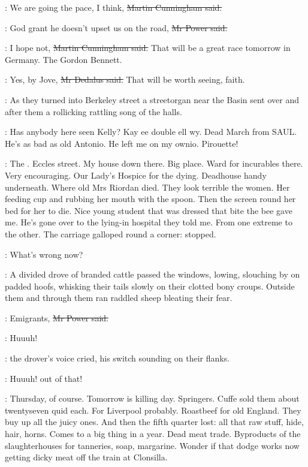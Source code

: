 \cunningham:
We are going the pace, I think,
\sout{Martin Cunningham said.}

\power:
God grant he doesn't upset us on the road,
\sout{Mr Power said.}

\cunningham:
I hope not,
\sout{Martin Cunningham said.}
That will be a great race tomorrow in Germany.
The Gordon Bennett.

\simon:
Yes, by Jove,
\sout{Mr Dedalus said.}
That will be worth seeing, faith.

:
As they turned into Berkeley street
a streetorgan near the Basin sent over and after them
a rollicking rattling song of the halls.

:
Has anybody here seen Kelly?
Kay ee double ell wy.
Dead March from SAUL.
He's as bad
as old Antonio.
He left me on my ownio.
Pirouette!

\BloomInt:
The .
Eccles street.
My house down there.
Big place.
Ward for incurables there.
Very encouraging.
Our Lady's Hospice for the dying.
Deadhouse handy underneath.
Where old Mrs Riordan died.
They look terrible the women.
Her feeding cup and rubbing her mouth with the spoon.
Then the screen round her bed for her to die.
Nice young student that was dressed that bite the bee gave me.
He's gone over to the lying-in hospital they told me.
From one extreme to the other.
The carriage galloped round a corner:
stopped.

\cunningham:
What's wrong now?

:
A divided drove of branded cattle passed the windows,
lowing,
slouching by on padded hoofs,
whisking their tails slowly on their clotted bony croups.
Outside them and through them ran
raddled sheep bleating their fear.

\power:
Emigrants,
\sout{Mr Power said.}

\drover:
Huuuh!

:
the drover's voice cried,
his switch sounding on their flanks.

\drover:
Huuuh!
out of that!

\BloomInt:
Thursday, of course.
Tomorrow is killing day.
Springers.
Cuffe sold them about twentyseven quid each.
For Liverpool probably.
Roastbeef for old England.
They buy up all the juicy ones.
And then the fifth quarter lost:
all that raw stuff, hide, hair, horns.
Comes to a big thing in a year.
Dead meat trade.
Byproducts of the slaughterhouses for tanneries, soap, margarine.
Wonder if that dodge works now
getting dicky meat off the train at Clonsilla.

